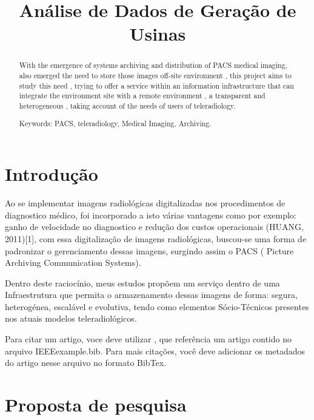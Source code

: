 \documentclass[conference]{IEEEtran}
\title{Análise de Dados de Geração de Usinas}
\author{
\IEEEauthorblockN{Leonardo Felipe da Silva dos Santos}
\IEEEauthorblockA{Santa Maria, Rio Grande do Sul, Brasil\\ Email: leonardo.santos@acad.ufsm.br}
}
\begin{document}
\maketitle
\thispagestyle{empty}
\pagestyle{empty}


\begin{abstract}

With the emergence of systems archiving and distribution of PACS medical imaging, also emerged the need to store those images off-site environment , this project aims to study this need , trying to offer a service within an information infrastructure that can integrate the environment site with a remote environment , a transparent and heterogeneous , taking account of the needs of users of teleradiology.


Keywords: PACS, teleradiology, Medical Imaging, Archiving.

\end{abstract}


\section{Introdução}

Ao se implementar imagens radiológicas digitalizadas nos procedimentos de diagnostico médico, foi incorporado a isto várias vantagens como por exemplo: ganho de velocidade no diagnostico e redução dos custos operacionais (HUANG, 2011)[1], com essa digitalização de imagens radiológicas, buscou-se uma forma de padronizar o gerenciamento dessas imagens, surgindo assim o PACS ( Picture Archiving Communication Systems).

Dentro deste raciocínio, meus estudos propõem um serviço dentro de uma Infraestrutura que permita o armazenamento dessas imagens de forma: segura, heterogénea, escalável e evolutiva, tendo como elementos Sócio-Técnicos presentes nos atuais modelos teleradiológicos. 


Para citar um artigo, voce deve utilizar \cite{IEEEexample:articleetal}, que referência um artigo contido no arquivo IEEEexample.bib. Para mais citações, você deve adicionar os metadados do artigo nesse arquivo no formato BibTex.

\section{Proposta de pesquisa}
\end{document}
